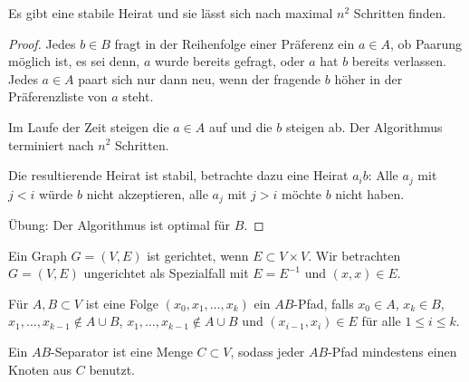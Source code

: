 \begin{st}
    Es gibt eine stabile Heirat und sie lässt sich nach maximal $n^2$ Schritten finden.
    \begin{proof}
        Jedes $b \in B$ fragt in der Reihenfolge einer Präferenz ein $a \in A$, ob Paarung möglich ist, es sei denn, $a$ wurde bereits gefragt, oder $a$ hat $b$ bereits verlassen.
        Jedes $a \in A$ paart sich nur dann neu, wenn der fragende $b$ höher in der Präferenzliste von $a$ steht.

        Im Laufe der Zeit steigen die $a \in A$ auf und die $b$ steigen ab.
        Der Algorithmus terminiert nach $n^2$ Schritten.

        Die resultierende Heirat ist stabil, betrachte dazu eine Heirat $a_i b$:
        Alle $a_j$ mit $j < i$ würde $b$ nicht akzeptieren, alle $a_j$ mit $j > i$ möchte $b$ nicht haben.

        Übung: Der Algorithmus ist optimal für $B$.
    \end{proof}
\end{st}

\begin{df}
    Ein Graph $G = (V, E)$ ist gerichtet, wenn $E \subset V \times V$.
    Wir betrachten $G = (V, E)$ ungerichtet als Spezialfall mit $E = E^{-1}$ und $(x,x) \in E$.

    Für $A, B \subset V$ ist eine Folge $(x_0, x_1, \dotsc, x_k)$ ein $AB$-Pfad, falls $x_0 \in A$, $x_k \in B$,
    $x_1, \dotsc, x_{k-1} \not\in A \cup B$, $x_1, \dotsc, x_{k-1} \not \in A \cup B$ und $(x_{i-1}, x_i) \in E$ für alle $1 \le i \le k$.

    Ein $AB$-Separator ist eine Menge $C \subset V$, sodass jeder $AB$-Pfad mindestens einen Knoten aus $C$ benutzt.
\end{df}


